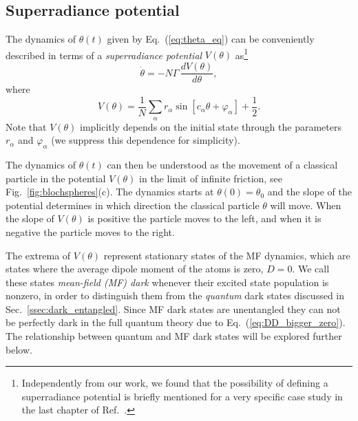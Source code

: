 \documentclass[aps,prx,superscriptaddress,twocolumn,notitlepage,nofootinbib,longbibliography]{revtex4-2}
\begin{document}

\subsection{Superradiance potential\label{ssec:superrad_pot}}

The dynamics of $\theta(t)$ given by Eq.~(\ref{eq:theta_eq}) can be conveniently described in terms of a \emph{superradiance potential} $V(\theta)$ as\footnote{Independently from our work, we found that the possibility of defining a superradiance potential is briefly mentioned for a very specific case study in the last chapter of Ref.~\cite{GrossHarocheSuperr}.}
\begin{equation}
	\dot\theta = - N \Gamma\, \frac{d V(\theta)}{d\theta},
\label{eq:theta_eq_pot}
\end{equation}
where
\begin{equation}
	V(\theta) = \frac{1}{N} \sum_\alpha r_\alpha \sin\left[ c_\alpha \theta + \varphi_\alpha \right] + \frac{1}{2}.
\label{eq:V_general}
\end{equation}
Note that $V(\theta)$ implicitly depends on the initial state through the parameters $r_\alpha$ and $\varphi_\alpha$ (we suppress this dependence for simplicity). 

The dynamics of $\theta(t)$ can then be understood as the movement of a classical particle in the potential $V(\theta)$ in the limit of infinite friction, see Fig.~\ref{fig:blochspheres}(c). The dynamics starts at $\theta(0)=\theta_0$ and the slope of the potential determines in which direction the classical particle $\theta$ will move. When the slope of $V(\theta)$ is positive the particle moves to the left, and when it is negative the particle moves to the right.

The extrema of $V(\theta)$ represent stationary states of the MF dynamics, which are states where the average dipole moment of the atoms is zero, $D=0$. We call these states \emph{mean-field (MF) dark} whenever their excited state population is nonzero, in order to distinguish them from the \emph{quantum} dark states discussed in Sec.~\ref{ssec:dark_entangled}. Since MF dark states are unentangled they can not be perfectly dark in the full quantum theory due to Eq.~(\ref{eq:DD_bigger_zero}). The relationship between quantum and MF dark states will be explored further below.
\end{document}
